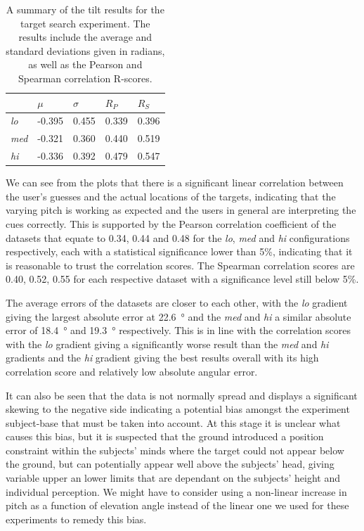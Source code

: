 \documentclass[format=sigconf, review=true, screen=true, anonymous=true]{acmart}
\begin{document}
\begin{table}
  \centering
  \caption{A summary of the tilt results for the target search experiment. The results include the average and standard deviations given in radians, as well as the Pearson and Spearman correlation R-scores.}
  \label{tab:tilt-results}
  \begin{tabular}{|l|l|l|l|l|}
    \hline
    & $\mu$ & $\sigma$ & $R_{P}$ & $R_{S}$ \\\hline\hline
    \emph{lo}  & -0.395 & 0.455 & 0.339 & 0.396 \\\hline
    \emph{med} & -0.321 & 0.360 & 0.440 & 0.519 \\\hline
    \emph{hi}  & -0.336 & 0.392 & 0.479 & 0.547 \\\hline
  \end{tabular}
\end{table}

We can see from the plots that there is a significant linear correlation between the user's guesses and the actual locations of the targets, indicating that the varying pitch is working as expected and the users in general are interpreting the cues correctly. This is supported by the Pearson correlation coefficient of the datasets that equate to 0.34, 0.44 and 0.48 for the \emph{lo}, \emph{med} and \emph{hi} configurations respectively, each with a statistical significance lower than 5\%, indicating that it is reasonable to trust the correlation scores. The Spearman correlation scores are 0.40, 0.52, 0.55 for each respective dataset with a significance level still below 5\%. 

The average errors of the datasets are closer to each other, with the \emph{lo} gradient giving the largest absolute error at \SI{22.6}{\degree} and the \emph{med} and \emph{hi} a similar absolute error of \SI{18.4}{\degree} and \SI{19.3}{\degree} respectively. This is in line with the correlation scores with the \emph{lo} gradient giving a significantly worse result than the \emph{med} and \emph{hi} gradients and the \emph{hi} gradient giving the best results overall with its high correlation score and relatively low absolute angular error. 

It can also be seen that the data is not normally spread and displays a significant skewing to the negative side indicating a potential bias amongst the experiment subject-base that must be taken into account. At this stage it is unclear what causes this bias, but it is suspected that the ground introduced a position constraint within the subjects' minds where the target could not appear below the ground, but can potentially appear well above the subjects' head, giving variable upper an lower limits that are dependant on the subjects' height and individual perception. We might have to consider using a non-linear increase in pitch as a function of elevation angle instead of the linear one we used for these experiments to remedy this bias.
\end{document}

